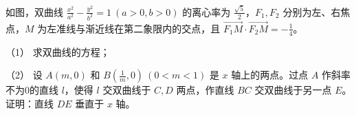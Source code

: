 \begin{question}
如图，双曲线 $\frac{x^2}{a^2}-\frac{y^2}{b^2}=1\ (a>0,b>0)$ 的离心率为 $\frac{\sqrt5}2$，$F_1,F_2$ 分别为左、右焦点，$M$ 为左准线与渐近线在第二象限内的交点，且 $\overrightarrow{F_1M}\cdot\overrightarrow{F_2M}=-\frac14$。

（1） 求双曲线的方程；

（2） 设 $A(m,0)$ 和 $B(\frac1m,0)\ (0<m<1)$ 是 $x$ 轴上的两点。过点 $A$ 作斜率不为0的直线 $l$，使得 $l$ 交双曲线于 $C,D$ 两点，作直线 $BC$ 交双曲线于另一点 $E$。证明：直线 $DE$ 垂直于 $x$ 轴。
\nopagebreak[4]
\begin{center}\end{center}
\nopagebreak[4]

\end{question}